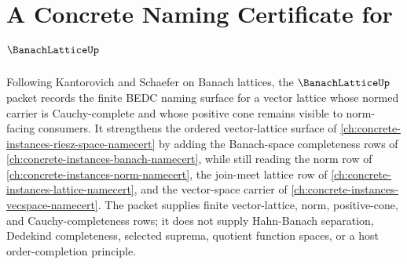 \chapter{A Concrete Naming Certificate for $\BanachLatticeUp$}
\label{ch:concrete-instances-banach-lattice-namecert}

Following Kantorovich and Schaefer on Banach lattices, the $\BanachLatticeUp$ packet records the finite BEDC naming surface for a vector lattice whose normed carrier is Cauchy-complete and whose positive cone remains visible to norm-facing consumers. It strengthens the ordered vector-lattice surface of \autoref{ch:concrete-instances-riesz-space-namecert} by adding the Banach-space completeness rows of \autoref{ch:concrete-instances-banach-namecert}, while still reading the norm row of \autoref{ch:concrete-instances-norm-namecert}, the join-meet lattice row of \autoref{ch:concrete-instances-lattice-namecert}, and the vector-space carrier of \autoref{ch:concrete-instances-vecspace-namecert}. The packet supplies finite vector-lattice, norm, positive-cone, and Cauchy-completeness rows; it does not supply Hahn-Banach separation, Dedekind completeness, selected suprema, quotient function spaces, or a host order-completion principle.

